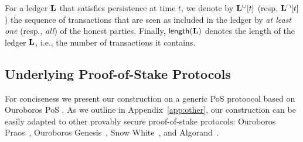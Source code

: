 For a ledger $\mathbf{L}$ that satisfies persistence at time $t$, we denote by $\mathbf{L}^{\cup}[t]$ (resp.
$\mathbf{L}^{\cap}[t]$) the sequence of transactions that are seen as
included in the ledger by \emph{at least one} (resp., \emph{all}) of the honest
parties. Finally, $\mathsf{length}(\mathbf{L})$ denotes the length of the ledger $\mathbf{L}$,
i.e., the number of transactions it contains.


\subsection{Underlying Proof-of-Stake Protocols}
\label{sec:ouroboros}
\label{sec:pos}

For conciseness we present our construction on a generic PoS protoocol
 based on  Ouroboros PoS \cite{C:KRDO17}. As we outline
in Appendix~\ref{app:other}, our construction can  be easily adapted to other
provably secure proof-of-stake protocols: Ouroboros
Praos~\cite{EC:DGKR18}, Ouroboros Genesis~\cite{genesis}, Snow
White~\cite{DBLP:journals/iacr/BentovPS16a}, and Algorand~\cite{algorand}.
